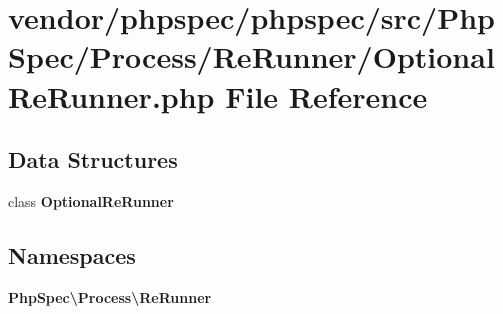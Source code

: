 \section{vendor/phpspec/phpspec/src/\+Php\+Spec/\+Process/\+Re\+Runner/\+Optional\+Re\+Runner.php File Reference}
\label{_optional_re_runner_8php}
\subsection*{Data Structures}
\begin{DoxyCompactItemize}
\item 
class {\bf Optional\+Re\+Runner}
\end{DoxyCompactItemize}
\subsection*{Namespaces}
\begin{DoxyCompactItemize}
\item 
 {\bf Php\+Spec\textbackslash{}\+Process\textbackslash{}\+Re\+Runner}
\end{DoxyCompactItemize}
